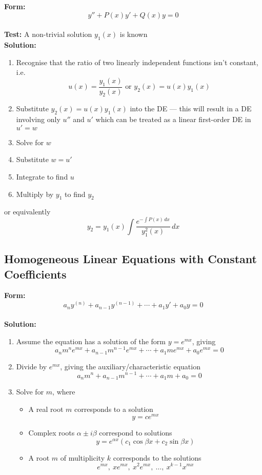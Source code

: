\documentclass{article}
\begin{document}
\textbf{Form:} \[y'' + P(x) y' + Q(x) y = 0\] \\ \textbf{Test:} A non-trivial solution $y_1(x)$ is known \\ \textbf{Solution:} \begin{enumerate}
  \item Recognise that the ratio of two linearly independent functions isn't constant, i.e. \[u(x) = \frac{y_1(x)}{y_2(x)} \text{ or } y_2(x) = u(x) y_1(x)\]

  \item Substitute $y_2(x) = u(x) y_1(x)$ into the DE — this will result in a DE involving only $u''$ and $u'$ which can be treated as a linear first-order DE in $u' = w$

  \item Solve for $w$

  \item Substitute $w = u'$

  \item Integrate to find $u$

  \item Multiply by $y_1$ to find $y_2$
\end{enumerate} or equivalently \[y_2 = y_1(x) \int \frac{e^{-\int P(x) \,dx}}{y_1^2(x)} \,dx\]

\subsection{Homogeneous Linear Equations with Constant Coefficients}

\textbf{Form:} \[a_n y^{(n)} + a_{n - 1} y^{(n - 1)} + \cdots + a_1 y' + a_0 y = 0\] \\ \textbf{Solution:} \begin{enumerate}
  \item Assume the equation has a solution of the form $y = e^{mx}$, giving \[a_n m^n e^{mx} + a_{n - 1} m^{n - 1} e^{mx} + \cdots + a_1 m e^{mx} + a_0 e^{mx} = 0\]

  \item Divide by $e^{mx}$, giving the auxiliary/characteristic equation \[a_n m^n + a_{n - 1} m^{n - 1} + \cdots + a_1 m + a_0 = 0\]

  \item Solve for $m$, where

        \begin{itemize}
          \item A real root $m$ corresponds to a solution \[y = ce^{mx}\]

\item Complex roots $\alpha \pm i \beta$ correspond to solutions \[y = e^{\alpha x} (c_1 \cos \beta x + c_2 \sin \beta x)\]

          \item A root $m$ of multiplicity $k$ corresponds to the solutions \[e^{mx}, \: x e^{mx}, \: x^2 e^{mx}, \: \ldots, \: x^{k - 1} x^{mx}\]
        \end{itemize}
\end{enumerate}
\end{document}
